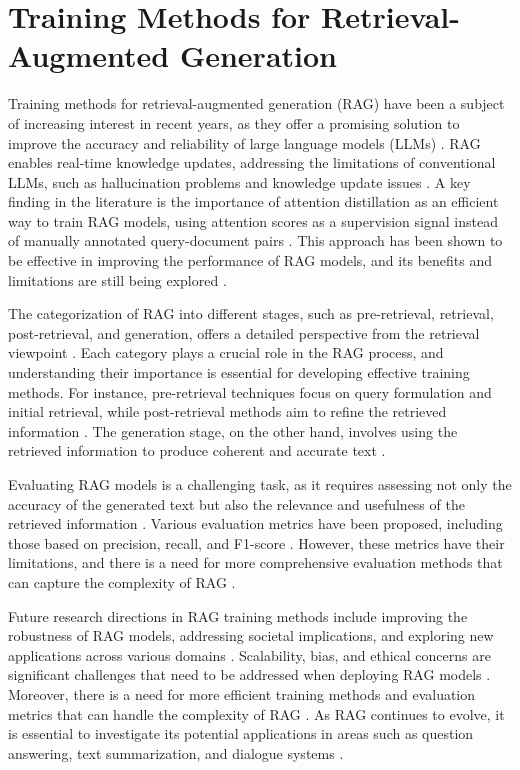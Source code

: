 \documentclass[conference]{IEEEtran}
\begin{document}
\section{Training Methods for Retrieval-Augmented Generation}
Training methods for retrieval-augmented generation (RAG) have been a subject of increasing interest in recent years, as they offer a promising solution to improve the accuracy and reliability of large language models (LLMs) \cite{b1}. RAG enables real-time knowledge updates, addressing the limitations of conventional LLMs, such as hallucination problems and knowledge update issues \cite{b2}. A key finding in the literature is the importance of attention distillation as an efficient way to train RAG models, using attention scores as a supervision signal instead of manually annotated query-document pairs \cite{b3}. This approach has been shown to be effective in improving the performance of RAG models, and its benefits and limitations are still being explored \cite{b4}.

The categorization of RAG into different stages, such as pre-retrieval, retrieval, post-retrieval, and generation, offers a detailed perspective from the retrieval viewpoint \cite{b5}. Each category plays a crucial role in the RAG process, and understanding their importance is essential for developing effective training methods. For instance, pre-retrieval techniques focus on query formulation and initial retrieval, while post-retrieval methods aim to refine the retrieved information \cite{b6}. The generation stage, on the other hand, involves using the retrieved information to produce coherent and accurate text \cite{b7}.

Evaluating RAG models is a challenging task, as it requires assessing not only the accuracy of the generated text but also the relevance and usefulness of the retrieved information \cite{b8}. Various evaluation metrics have been proposed, including those based on precision, recall, and F1-score \cite{b9}. However, these metrics have their limitations, and there is a need for more comprehensive evaluation methods that can capture the complexity of RAG \cite{b10}.

Future research directions in RAG training methods include improving the robustness of RAG models, addressing societal implications, and exploring new applications across various domains \cite{b11}. Scalability, bias, and ethical concerns are significant challenges that need to be addressed when deploying RAG models \cite{b12}. Moreover, there is a need for more efficient training methods and evaluation metrics that can handle the complexity of RAG \cite{b13}. As RAG continues to evolve, it is essential to investigate its potential applications in areas such as question answering, text summarization, and dialogue systems \cite{b14}.
\end{document}
